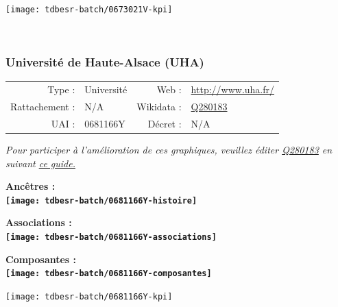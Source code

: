 \documentclass[12pt,french,]{article}
\begin{document}
\begin{center}\texttt{[image: tdbesr-batch/0673021V-kpi]} \end{center}\checkoddpage

\ifoddpage \fi ~\newpage  

\hypertarget{universituxe9-de-haute-alsace-uha}{%
\subsubsection{Université de Haute-Alsace
(UHA)}\label{universituxe9-de-haute-alsace-uha}}

\begin{tabular*}{\textwidth}{rp{5cm}rl}  
\hline  
Type : & Université & Web : &\href{http://www.uha.fr/}{http://www.uha.fr/} \\  
Rattachement : & N/A & Wikidata : & \href{https://www.wikidata.org/entity/Q280183}{Q280183} \\  
UAI : & 0681166Y & Décret : & N/A \\  
\hline  
\end{tabular*}

\textit{\scriptsize Pour participer à l'amélioration de ces graphiques, veuillez éditer  \href{https://www.wikidata.org/entity/Q280183}{Q280183}  en suivant \href{https://github.com/cpesr/wikidataESR/blob/master/Rmd/wikidataESR.md}{ce guide.}}

\vspace{1cm}  
\begin{minipage}[b]{0.50\textwidth}\begin{center} \bf Ancêtres : \\  
\texttt{[image: tdbesr-batch/0681166Y-histoire]} \end{center}\end{minipage}\begin{minipage}[b]{0.50\textwidth}\begin{center} \bf Associations : \\  
\texttt{[image: tdbesr-batch/0681166Y-associations]} \end{center}\end{minipage}

\hrulefill

\begin{center} \bf Composantes : \\  
\texttt{[image: tdbesr-batch/0681166Y-composantes]} \end{center}

\begin{center}\texttt{[image: tdbesr-batch/0681166Y-kpi]} \end{center}\checkoddpage
\end{document}
